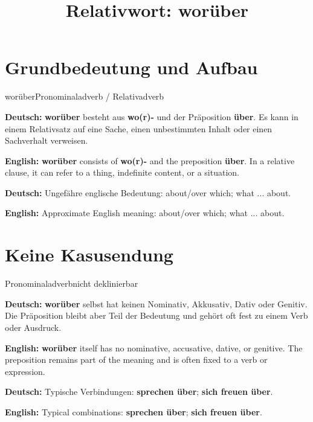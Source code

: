 \documentclass[a4paper,11pt]{article}
\title{Relativwort: \glqq worüber\grqq{}}
\date{}
\newcommand{\GermanText}[1]{\textbf{Deutsch: }#1\par}
\newcommand{\EnglishText}[1]{{\small\color{SoftGray}\textbf{English: }#1\par}}
\begin{document}
\maketitle

\tableofcontents

\newpage

\section{Grundbedeutung und Aufbau}

\begin{grammarentry}{worüber}{Pronominaladverb / Relativadverb}

\GermanText{\textbf{worüber} besteht aus \textbf{wo(r)-} und der Präposition \textbf{über}. Es kann in einem Relativsatz auf eine Sache, einen unbestimmten Inhalt oder einen Sachverhalt verweisen.}

\EnglishText{\textbf{worüber} consists of \textbf{wo(r)-} and the preposition \textbf{über}. In a relative clause, it can refer to a thing, indefinite content, or a situation.}

\GermanText{Ungefähre englische Bedeutung: \glqq about/over which; what ... about\grqq{}.}

\EnglishText{Approximate English meaning: \glqq about/over which; what ... about\grqq{}.}

\end{grammarentry}

\section{Keine Kasusendung}

\begin{grammarentry}{Pronominaladverb}{nicht deklinierbar}

\GermanText{\textbf{worüber} selbst hat keinen Nominativ, Akkusativ, Dativ oder Genitiv. Die Präposition bleibt aber Teil der Bedeutung und gehört oft fest zu einem Verb oder Ausdruck.}

\EnglishText{\textbf{worüber} itself has no nominative, accusative, dative, or genitive. The preposition remains part of the meaning and is often fixed to a verb or expression.}

\GermanText{Typische Verbindungen: \textbf{sprechen über}; \textbf{sich freuen über}.}

\EnglishText{Typical combinations: \textbf{sprechen über}; \textbf{sich freuen über}.}

\end{grammarentry}
\end{document}
